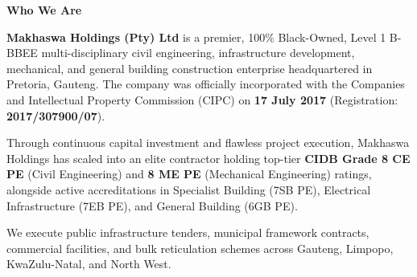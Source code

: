 \documentclass[a4paper,11pt]{article}
\begin{document}
\noindent
\begin{minipage}[t]{0.62\textwidth}
    {\large\bfseries\color{mhnavy} Who We Are}
    \vspace{0.12cm}

    {\fontsize{9.0pt}{13.0pt}\selectfont\color{mhtext}
    \textbf{Makhaswa Holdings (Pty) Ltd} is a premier, 100\% Black-Owned, Level 1 B-BBEE multi-disciplinary civil engineering, infrastructure development, mechanical, and general building construction enterprise headquartered in Pretoria, Gauteng. The company was officially incorporated with the Companies and Intellectual Property Commission (CIPC) on \textbf{17 July 2017} (Registration: \textbf{2017/307900/07}).
    }

    \vspace{0.22cm}

    {\fontsize{9.0pt}{13.0pt}\selectfont\color{mhtext}
    Through continuous capital investment and flawless project execution, Makhaswa Holdings has scaled into an elite contractor holding top-tier \textbf{CIDB Grade 8 CE PE} (Civil Engineering) and \textbf{8 ME PE} (Mechanical Engineering) ratings, alongside active accreditations in Specialist Building (7SB PE), Electrical Infrastructure (7EB PE), and General Building (6GB PE).
    }

    \vspace{0.22cm}

    {\fontsize{9.0pt}{13.0pt}\selectfont\color{mhtext}
    We execute public infrastructure tenders, municipal framework contracts, commercial facilities, and bulk reticulation schemes across Gauteng, Limpopo, KwaZulu-Natal, and North West.
    }
\end{minipage}
\hfill
\end{document}
